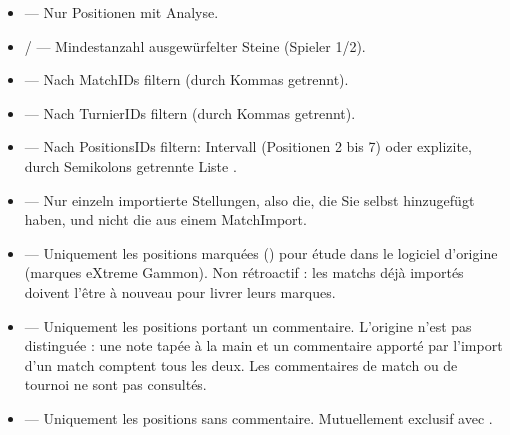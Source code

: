 \documentclass[letterpaper,10pt,german]{sphinxmanual}
\begin{document}
\begin{itemize}
\item {} 
\sphinxAtStartPar
{} — Nur Positionen mit Analyse.

\item {} 
\sphinxAtStartPar
{} /  — Mindestanzahl ausgewürfelter Steine (Spieler 1/2).

\item {} 
\sphinxAtStartPar
{} — Nach Match\sphinxhyphen{}IDs filtern (durch Kommas getrennt).

\item {} 
\sphinxAtStartPar
{} — Nach Turnier\sphinxhyphen{}IDs filtern (durch Kommas getrennt).

\item {} 
\sphinxAtStartPar
{} — Nach Positions\sphinxhyphen{}IDs filtern: Intervall  (Positionen 2 bis 7) oder explizite, durch Semikolons getrennte Liste .

\item {} 
\sphinxAtStartPar
{} — Nur einzeln importierte Stellungen, also die, die Sie selbst hinzugefügt haben, und nicht die aus einem Match\sphinxhyphen{}Import.

\item {} 
\sphinxAtStartPar
{} — Uniquement les positions marquées () pour étude dans
le logiciel d’origine (marques eXtreme Gammon). Non rétroactif : les
matchs déjà importés doivent l’être à nouveau pour livrer leurs marques.

\item {} 
\sphinxAtStartPar
{} — Uniquement les positions portant un commentaire.
L’origine n’est pas distinguée : une note tapée à la main et un commentaire
apporté par l’import d’un match comptent tous les deux. Les commentaires de
match ou de tournoi ne sont pas consultés.

\item {} 
\sphinxAtStartPar
{} — Uniquement les positions sans commentaire. Mutuellement
exclusif avec .

\end{itemize}
\end{document}
